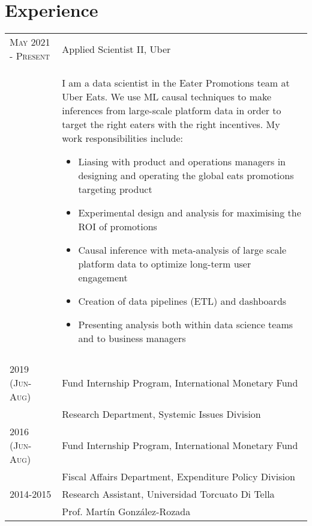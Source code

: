 \documentclass[letterpaper,9pt]{article} %
\begin{document}


\section{Experience}

\begin{tabular}{>{\raggedleft\arraybackslash}p{}|p{}}
	\textsc{May 2021 - Present} & Applied Scientist II, Uber \\
	& \footnotesize{I am a data scientist in the Eater Promotions team at Uber Eats. We use ML causal techniques to make inferences from large-scale platform data in order to target the right eaters with the right incentives. My work responsibilities include:
		\begin{itemize} 
			\item Liasing with product and operations managers in designing and operating the global eats promotions targeting product
			\item Experimental design and analysis for maximising the ROI of promotions
			\item Causal inference with meta-analysis of large scale platform data to optimize long-term user engagement
			\item Creation of data pipelines (ETL) and dashboards
			\item Presenting analysis both within data science teams and to business managers
		\end{itemize}} 	\\
	
	& \\
	
	\textsc{2019 (Jun-Aug)} & Fund Internship Program, International Monetary Fund \\
	& \footnotesize{Research Department, Systemic Issues Division} \\
	\textsc{2016 (Jun-Aug)} & Fund Internship Program, International Monetary Fund \\
	& \footnotesize{Fiscal Affairs Department, Expenditure Policy Division} \\
	\textsc{2014-2015} & Research Assistant, Universidad Torcuato Di Tella \\
	& \footnotesize{Prof. Martín González-Rozada} \\

\end{tabular}
\end{document}

